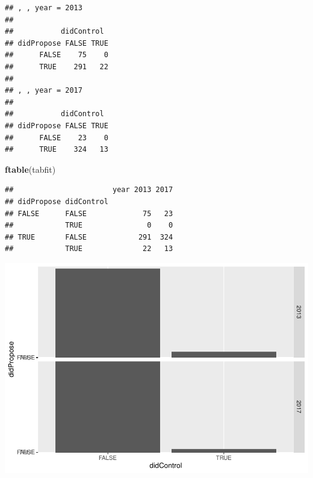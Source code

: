 \documentclass[
]{article}
\newenvironment{Shaded}{\begin{snugshade}}{\end{snugshade}}
\newcommand{\DataTypeTok}[1]{\textcolor[rgb]{0.13,0.29,0.53}{#1}}
\newcommand{\KeywordTok}[1]{\textcolor[rgb]{0.13,0.29,0.53}{\textbf{#1}}}
\newcommand{\NormalTok}[1]{#1}
\newcommand{\OperatorTok}[1]{\textcolor[rgb]{0.81,0.36,0.00}{\textbf{#1}}}
\newcommand{\StringTok}[1]{\textcolor[rgb]{0.31,0.60,0.02}{#1}}
\begin{document}
\begin{verbatim}
## , , year = 2013
## 
##           didControl
## didPropose FALSE TRUE
##      FALSE    75    0
##      TRUE    291   22
## 
## , , year = 2017
## 
##           didControl
## didPropose FALSE TRUE
##      FALSE    23    0
##      TRUE    324   13
\end{verbatim}

\begin{Shaded}
\begin{Highlighting}[]
\KeywordTok{ftable}\NormalTok{(tabfit)}
\end{Highlighting}
\end{Shaded}

\begin{verbatim}
##                       year 2013 2017
## didPropose didControl               
## FALSE      FALSE             75   23
##            TRUE               0    0
## TRUE       FALSE            291  324
##            TRUE              22   13
\end{verbatim}

\begin{Shaded}
\end{Shaded}

\includegraphics{ProposalAnalysis_files/figure-latex/unnamed-chunk-8-1.pdf}
\end{document}
